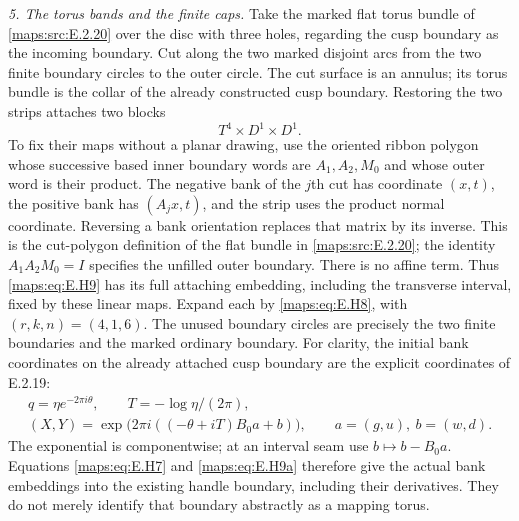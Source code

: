 \begin{theorem}
\emph{5. The torus bands and the finite caps.}
Take the marked flat torus bundle of \ref{maps:src:E.2.20} over the disc with
three holes, regarding the cusp boundary as the incoming boundary.
Cut along the two marked disjoint arcs from the two finite boundary
circles to the outer circle.  The cut surface is an annulus;
its torus bundle is the collar of the already constructed cusp
boundary.  Restoring the two strips attaches two blocks
\[
                 T^4\times D^1\times D^1.
 \tag{E.H9}\label{maps:eq:E.H9}
\]
To fix their maps without a planar drawing, use the oriented ribbon
polygon whose successive based inner boundary words are
$A_1,A_2,M_0$ and whose outer word is their product.  The negative
bank of the $j$th cut has coordinate $(x,t)$, the positive bank
has $(A_jx,t)$, and the strip uses the product normal coordinate.
Reversing a bank orientation replaces that matrix by its inverse.
This is the cut-polygon definition of the flat bundle in \ref{maps:src:E.2.20};
the identity $A_1A_2M_0=I$ specifies the unfilled outer boundary.
There is no affine term.  Thus \eqref{maps:eq:E.H9} has its full attaching
embedding, including the transverse interval, fixed by these
linear maps.  Expand each by \eqref{maps:eq:E.H8}, with $(r,k,n)=(4,1,6)$.
The unused boundary circles are precisely the two finite boundaries
and the marked ordinary boundary.
For clarity, the initial bank coordinates on the already attached
cusp boundary are the explicit coordinates of E.2.19:
\[
 \begin{gathered}
 q=\eta e^{-2\pi i\theta},\qquad T=-\log\eta/(2\pi),\\
 (X,Y)=\exp\bigl(2\pi i((-\theta+iT)B_0a+b)\bigr),
 \qquad a=(g,u),\ b=(w,d).
 \end{gathered}
 \tag{E.H9a}\label{maps:eq:E.H9a}
\]
The exponential is componentwise; at an interval seam use
$b\mapsto b-B_0a$.  Equations \eqref{maps:eq:E.H7} and \eqref{maps:eq:E.H9a} therefore
give the actual bank embeddings into the existing handle
boundary, including their derivatives.  They do not merely
identify that boundary abstractly as a mapping torus.


\end{theorem}
